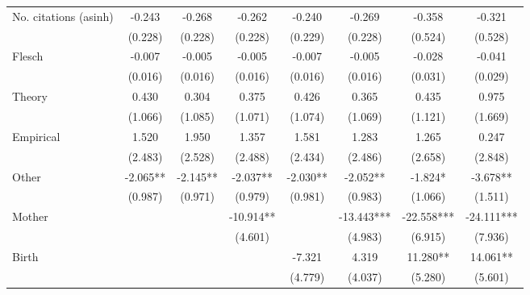 \begin{table}
\begin{adjustwidth}{-0.085cm}{}
\begin{threeparttable}
\begin{tabular}{p{2.64cm}SSSSSSS}
            No. citations (asinh)         &      -0.243   &      -0.268   &      -0.262   &      -0.240   &      -0.269   &      -0.358   &      -0.321   \\
                                          &     (0.228)   &     (0.228)   &     (0.228)   &     (0.229)   &     (0.228)   &     (0.524)   &     (0.528)   \\
            Flesch                        &      -0.007   &      -0.005   &      -0.005   &      -0.007   &      -0.005   &      -0.028   &      -0.041   \\
                                          &     (0.016)   &     (0.016)   &     (0.016)   &     (0.016)   &     (0.016)   &     (0.031)   &     (0.029)   \\
            Theory                        &       0.430   &       0.304   &       0.375   &       0.426   &       0.365   &       0.435   &       0.975   \\
                                          &     (1.066)   &     (1.085)   &     (1.071)   &     (1.074)   &     (1.069)   &     (1.121)   &     (1.669)   \\
            Empirical                     &       1.520   &       1.950   &       1.357   &       1.581   &       1.283   &       1.265   &       0.247   \\
                                          &     (2.483)   &     (2.528)   &     (2.488)   &     (2.434)   &     (2.486)   &     (2.658)   &     (2.848)   \\
            Other                         &      -2.065** &      -2.145** &      -2.037** &      -2.030** &      -2.052** &      -1.824*  &      -3.678** \\
                                          &     (0.987)   &     (0.971)   &     (0.979)   &     (0.981)   &     (0.983)   &     (1.066)   &     (1.511)   \\
            Mother                        &               &               &     -10.914** &               &     -13.443***&     -22.558***&     -24.111***\\
                                          &               &               &     (4.601)   &               &     (4.983)   &     (6.915)   &     (7.936)   \\
            Birth                         &               &               &               &      -7.321   &       4.319   &      11.280** &      14.061** \\
                                          &               &               &               &     (4.779)   &     (4.037)   &     (5.280)   &     (5.601)   \\

\end{tabular}
\end{threeparttable}
\end{adjustwidth}
\end{table}
